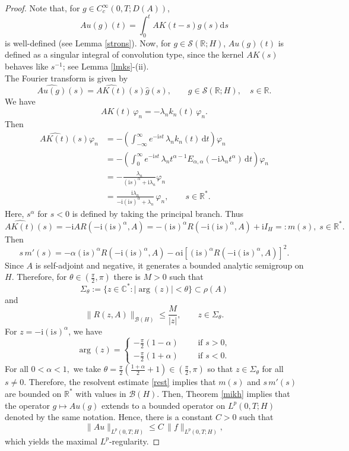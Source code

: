 \documentclass[reqno]{amsart}
\numberwithin{equation}{section}
\def \d {\mathrm{d}}
\begin{document}
\begin{proof}
Note that, for $g \in C_c^{\infty}(0, T;D(A))$, 
$$Au(g)(t)=\int_{0}^{t}AK(t-s)g(s)\d s$$
is well-defined (see Lemma \ref{strons}). Now, for $g\in \mathcal{S}(\mathbb{R};H)$, $Au(g)(t)$ is defined as a singular integral of convolution type, since the kernel $AK(s)$ behaves like $s^{-1}$; see Lemma \ref{lmks}-(ii).\\
The Fourier transform is given by
$$\widehat{Au(g)}(s)=\widehat{AK(t)}(s)\widehat{g}(s), \qquad g\in \mathcal{S}(\mathbb{R};H),\quad s\in \mathbb{R}.$$
We have
$$
AK(t)\,\varphi_n =-\lambda_n k_n(t)\,\varphi_n. $$
Then
\begin{align*}
\widehat{AK(t)}(s)\varphi_n &= -\left(\int_{-\infty}^{\infty} e^{-\mathrm{i}st}\,\lambda_n k_n(t)\,\d t\right)\varphi_n\\
&= -\left(\int_0^\infty e^{-\mathrm{i}st}\,\lambda_n t^{\alpha-1}E_{\alpha,\alpha}(-\mathrm{i}\lambda_n t^\alpha)\,\d t\right)\varphi_n\\
&=-\frac{\lambda_n}{(\mathrm{i}s)^\alpha +\mathrm{i}\lambda_n}\varphi_n\\
& = \frac{\mathrm{i}\lambda_n}{-\mathrm{i}(\mathrm{i}s)^\alpha + \lambda_n}\,\varphi_n, \qquad s\in \mathbb{R}^*.
\end{align*}
Here, $s^\alpha$ for $s<0$ is defined by taking the principal branch. Thus
$$\widehat{AK(t)}(s)= -\mathrm{i}AR(-\mathrm{i}(\mathrm{i}s)^\alpha,A)=-(\mathrm{i}s)^\alpha R(-\mathrm{i}(\mathrm{i}s)^\alpha,A)+\mathrm{i}I_H=:m(s), \; s\in \mathbb{R}^*.$$
Then
$$s\,m'(s)=-\alpha (\mathrm{i}s)^\alpha R(-\mathrm{i}(\mathrm{i}s)^\alpha,A)-\alpha \mathrm{i} [(\mathrm{i}s)^\alpha R(-\mathrm{i}(\mathrm{i}s)^\alpha,A)]^2.$$
Since $A$ is self-adjoint and negative, it generates a bounded analytic semigroup on $H$. Therefore, for $\theta\in (\frac{\pi}{2},\pi)$ there is $M>0$ such that
$$\Sigma_{\theta}:=\{z \in \mathbb{C}^* \colon |\arg (z)|<\theta\} \subset \rho(A)$$
and
\begin{equation}\label{rest}
\|R(z, A)\|_{\mathcal{B}(H)} \leq \frac{M}{|z|}, \qquad z \in \Sigma_{\theta}.
\end{equation}
For $z=-\mathrm{i}(\mathrm{i}s)^\alpha$, we have
$$\arg(z)=\begin{cases}
-\frac{\pi}{2}(1-\alpha) \qquad\mbox{ if } s>0,\\
-\frac{\pi}{2}(1+\alpha) \qquad\mbox{ if } s<0.
\end{cases}$$
For all $0<\alpha<1,$ we take $\theta=\frac{\pi}{2}(\frac{1+\alpha}{2}+1)\in (\frac{\pi}{2},\pi)$ so that $z\in \Sigma_{\theta}$ for all $s\neq 0$.
Therefore, the resolvent estimate \eqref{rest} implies that $m(s)$ and $s\,m'(s)$ are bounded on $\mathbb{R}^*$ with values in $\mathcal{B}(H)$. Then, Theorem \ref{mikh} implies that the operator $g\mapsto Au(g)$ extends to a bounded operator on $L^p(0,T;H)$ denoted by the same notation. Hence, there is a constant $C>0$ such that
\[
 \|Au\|_{L^p(0,T;H)}\le C\,\|f\|_{L^p(0,T;H)},
\]
which yields the maximal $L^p$-regularity.
\end{proof}
\end{document}
